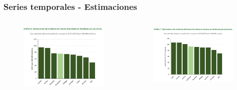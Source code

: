 \documentclass{beamer}
\begin{document}

\begin{frame}\frametitle{Series temporales - Estimaciones}
	
	\begin{columns}
		\begin{column}{0.5\textwidth}
			\begin{figure}
				\centering
				\includegraphics[width=.98\textwidth]{images/estimaciones_hombres2.png}
			\end{figure}
		\end{column}
		\begin{column}{0.5\textwidth}
			\begin{figure}
				\centering
				\includegraphics[width=1.02\textwidth]{images/estimaciones_mujeres2.png}
			\end{figure}
		\end{column}
	\end{columns}
	
\end{frame}
\end{document}

